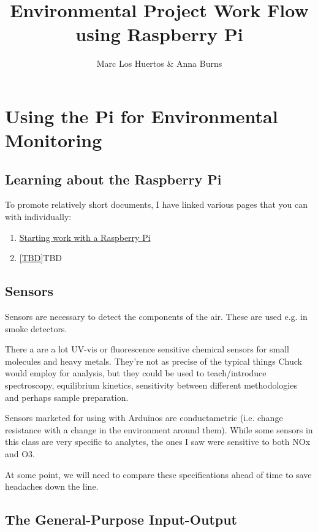 \documentclass{article}\usepackage[]{graphicx}\usepackage[]{color}
\title{Environmental Project Work Flow using Raspberry Pi}
\author{Marc Los Huertos \& Anna Burns}
\begin{document}
\maketitle

\section{Using the Pi for Environmental Monitoring}

\subsection{Learning about the Raspberry Pi}

To promote relatively short documents, I have linked various pages that you can with individually: 

\begin{enumerate}

\item \href{https://github.com/marclos/UAV/blob/1aa3b3c0816f86d09fffcdab50d768257d20d80f/Hardware/Raspberry_Pi/Raspberry_Pi_Guide.pdf}{Starting work with a Raspberry Pi}

\item \ref{TBD}{TBD}

\end{enumerate}

\subsection{Sensors}

Sensors are necessary to detect the components of the air. These are used e.g. in smoke detectors. 

There a are a lot UV-vis or fluorescence sensitive chemical sensors for small molecules and heavy metals. They're not as precise of the typical things Chuck would employ for analysis, but they could be used to teach/introduce  spectroscopy, equilibrium kinetics,  sensitivity between different methodologies and perhaps sample preparation.  

Sensors marketed for using with Arduinos are conductametric (i.e. change resistance with a change in the environment around them). While some sensors in this class are very specific to analytes, the ones I saw were sensitive to both NOx and O3. 

At some point, we will need to compare these specifications ahead of time to save headaches down the line.

\subsection{The General-Purpose Input-Output}
\end{document}
